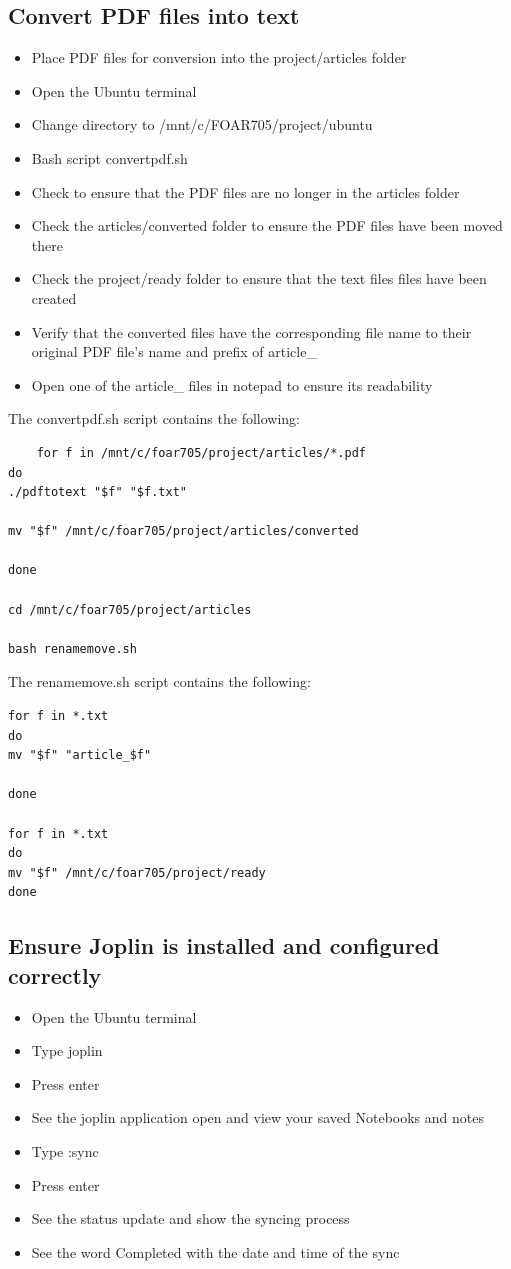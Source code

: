 \documentclass{article}
\begin{document}
\subsection{Convert PDF files into text}
\begin{itemize}
    \item Place PDF files for conversion into the project/articles folder
    \item Open the Ubuntu terminal
    \item Change directory to /mnt/c/FOAR705/project/ubuntu
    \item Bash script convertpdf.sh
    \item Check to ensure that the PDF files are no longer in the articles folder
    \item Check the articles/converted folder to ensure the PDF files have been moved there
    \item Check the project/ready folder to ensure that the text files files have been created
    \item Verify that the converted files have the corresponding file name to their original PDF file's name and prefix of article\_
    \item Open one of the article\_ files in notepad to ensure its readability
\end{itemize}
The convertpdf.sh script contains the following:
\begin{verbatim}
    for f in /mnt/c/foar705/project/articles/*.pdf
do
./pdftotext "$f" "$f.txt"

mv "$f" /mnt/c/foar705/project/articles/converted

done

cd /mnt/c/foar705/project/articles

bash renamemove.sh
\end{verbatim}
The renamemove.sh script contains the following:
\begin{verbatim}
for f in *.txt
do
mv "$f" "article_$f"

done

for f in *.txt
do
mv "$f" /mnt/c/foar705/project/ready
done

\end{verbatim}

\subsection{Ensure Joplin is installed and configured correctly}
\begin{itemize}
    \item Open the Ubuntu terminal
    \item Type joplin
    \item Press enter
    \item See the joplin application open and view your saved Notebooks and notes
    \item Type :sync
    \item Press enter
    \item See the status update and show the syncing process
    \item See the word Completed with the date and time of the sync
\end{itemize}
\end{document}

